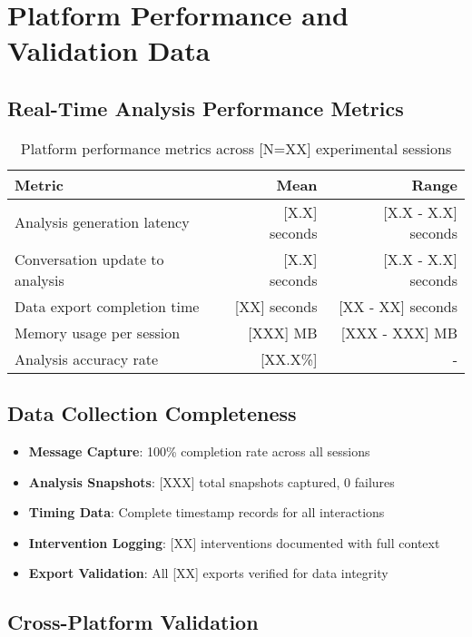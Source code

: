 \documentclass[11pt,letterpaper]{article}
\newcommand{\totalSessions}{[N=XX]} %
\begin{document}
\section{Platform Performance and Validation Data}
\label{app:performance}

\subsection{Real-Time Analysis Performance Metrics}

\begin{table}[h]
\centering
\begin{tabular}{lrr}
\toprule
\textbf{Metric} & \textbf{Mean} & \textbf{Range} \\
\midrule
Analysis generation latency & [X.X] seconds & [X.X - X.X] seconds \\
Conversation update to analysis & [X.X] seconds & [X.X - X.X] seconds \\
Data export completion time & [XX] seconds & [XX - XX] seconds \\
Memory usage per session & [XXX] MB & [XXX - XXX] MB \\
Analysis accuracy rate & [XX.X\%] & - \\
\bottomrule
\end{tabular}
\caption{Platform performance metrics across \totalSessions{} experimental sessions}
\label{tab:performance_metrics}
\end{table}

\subsection{Data Collection Completeness}

\begin{itemize}
    \item \textbf{Message Capture}: 100\% completion rate across all sessions
    \item \textbf{Analysis Snapshots}: [XXX] total snapshots captured, 0 failures
    \item \textbf{Timing Data}: Complete timestamp records for all interactions
    \item \textbf{Intervention Logging}: [XX] interventions documented with full context
    \item \textbf{Export Validation}: All [XX] exports verified for data integrity
\end{itemize}

\subsection{Cross-Platform Validation}
\end{document}
